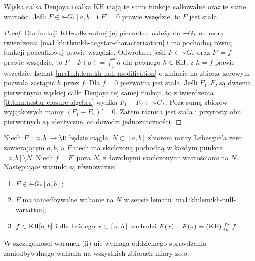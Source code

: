 \begin{wniosek}[Denjoy = KH]\label{it:cor:denjoy-hk}
Wąska całka Denjoya i całka KH mają te same funkcje całkowalne oraz te same wartości. Jeśli $F\in\AC G_*[a,b]$ i $F'=0$ prawie wszędzie, to $F$ jest stała.
\end{wniosek}
\begin{proof}
Dla funkcji KH-całkowalnej jej pierwotna należy do $\AC G_*$ na mocy twierdzenia \ref{ma1:kh:thm:kh-acgstar-characterization} i ma pochodną równą funkcji podcałkowej prawie wszędzie. Odwrotnie, jeśli $F\in\AC G_*$ oraz $F'=f$ prawie wszędzie, to $F-F(a)=\int_a^x h$ dla pewnego $h\in\mathrm{KH}$, z $h=f$ prawie wszędzie. Lemat \ref{ma1:kh:lem:kh-null-modification} o zmianie na zbiorze zerowym pozwala zastąpić $h$ przez $f$. Dla $f=0$ pierwotna jest stała. Jeśli $F_1,F_2$ są dwiema pierwotnymi wąskiej całki Denjoya tej samej funkcji, to z twierdzenia \ref{it:thm:acstar-closure-algebra} wynika $F_1-F_2\in\AC G_*$. Poza sumą zbiorów wyjątkowych mamy $(F_1-F_2)'=0$. Zatem różnica jest stała i przyrosty obu pierwotnych są identyczne, co dowodzi jednoznaczności.
\end{proof}
\begin{twierdzenie}
\label{it:thm:denjoy-exceptional-variation}
Niech $F:[a,b]\to\R$ będzie ciągła, $N\subset[a,b]$
zbiorem miary Lebesgue'a zero zawierającym $a,b$,
a $F$ niech ma skończoną pochodną w każdym punkcie
$[a,b]\setminus N$. Niech $f=F'$ poza $N$, z dowolnymi
skończonymi wartościami na $N$. Następujące warunki
są równoważne:
\begin{enumerate}[label=(\roman*)]
\item $F\in\AC G_*[a,b]$;
\item $F$ ma zaniedbywalne wahanie na $N$ w sensie lematu
\ref{ma1:kh:lem:kh-null-variation};
\item $f\in\mathrm{KH}[a,b]$ i dla każdego $x\in[a,b]$ zachodzi
$F(x)-F(a)=(\mathrm{KH})\int_a^x f$.
\end{enumerate}
W szczególności warunek (ii) nie wymaga oddzielnego
sprawdzania zaniedbywalnego wahania na wszystkich
zbiorach miary zero.
\end{twierdzenie}
